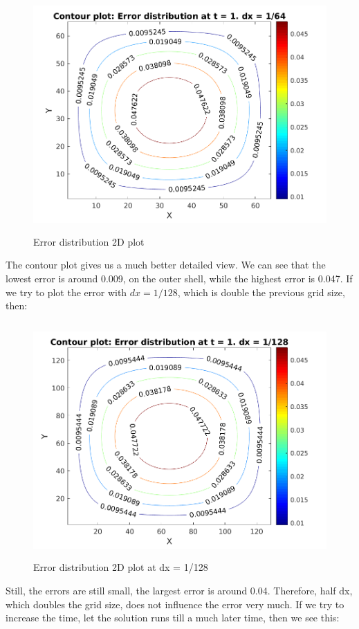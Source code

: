 \documentclass[12pt]{article}
\begin{document}
 	\begin{figure}[H]
 		\hfill\includegraphics[width=150mm,height= 90mm]{contour_error.png}\hspace*{\fill}
 		\caption{Error distribution 2D plot}
 	\end{figure}
 	\noindent
 	The contour plot gives us a much better detailed view.  We can see that the lowest error is around 0.009, on the outer shell, while the highest error is 0.047. If we try to plot the error with $dx = 1/128$, which is double the previous grid size, then: 
 	\begin{figure}[H]
 		\hfill\includegraphics[width=150mm,height= 90mm]{contour128_error.png}\hspace*{\fill}
 		\caption{Error distribution 2D plot at dx = 1/128}
 	\end{figure}
 	 \noindent
 	 Still, the errors are still small, the largest error is around 0.04. Therefore, half dx, which doubles the grid size, does not influence the error very much. If we try to increase the time, let the solution runs till a much later time, then we see this: 
\end{document}
